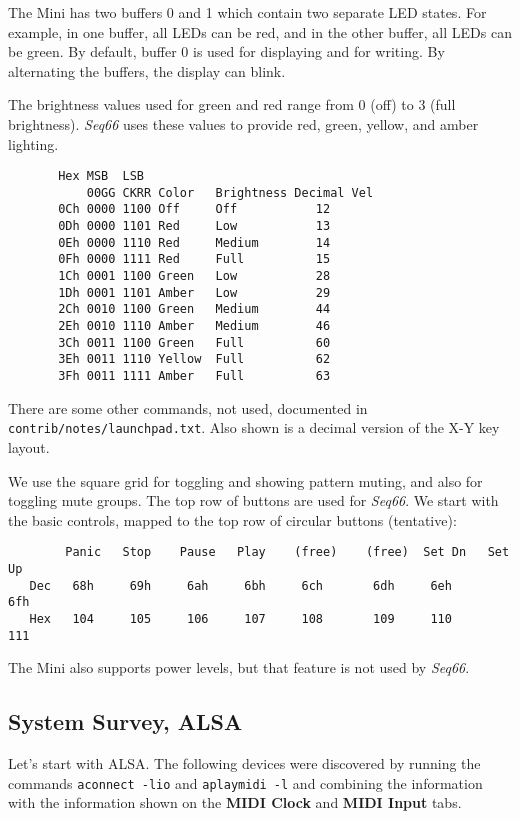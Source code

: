    The Mini has two buffers 0 and 1 which contain two separate LED states. For
   example, in one buffer, all LEDs can be red, and in the other buffer, all LEDs
   can be green.  By default, buffer 0 is used for displaying and for writing.
   By alternating the buffers, the display can blink.

   The brightness values used for green and red range from 0 (off) to 3 (full
   brightness).  \textsl{Seq66} uses these values to provide red, green, yellow,
   and amber lighting.

   \begin{verbatim}
       Hex MSB  LSB
           00GG CKRR Color   Brightness Decimal Vel
       0Ch 0000 1100 Off     Off           12
       0Dh 0000 1101 Red     Low           13
       0Eh 0000 1110 Red     Medium        14
       0Fh 0000 1111 Red     Full          15
       1Ch 0001 1100 Green   Low           28
       1Dh 0001 1101 Amber   Low           29
       2Ch 0010 1100 Green   Medium        44
       2Eh 0010 1110 Amber   Medium        46
       3Ch 0011 1100 Green   Full          60
       3Eh 0011 1110 Yellow  Full          62
       3Fh 0011 1111 Amber   Full          63
   \end{verbatim}

   There are some other commands, not used, documented in
   \texttt{contrib/notes/launchpad.txt}.
   Also shown is a decimal version of the X-Y key layout.

   We use the square grid for toggling and showing pattern muting, and also for
   toggling mute groups.
   The top row of buttons are used for \textsl{Seq66}. We start with the basic
   controls, mapped to the top row of circular buttons (tentative):

   \begin{verbatim}
        Panic   Stop    Pause   Play    (free)    (free)  Set Dn   Set Up
   Dec   68h     69h     6ah     6bh     6ch       6dh     6eh      6fh
   Hex   104     105     106     107     108       109     110      111
   \end{verbatim}

   The Mini also supports power levels, but that feature is not used by
   \textsl{Seq66}.

\subsection{System Survey, ALSA}
\label{subsec:launchpad_mini_survey_alsa}

   Let's start with ALSA.  The following devices were discovered by running the
   commands \texttt{aconnect -lio} and \texttt{aplaymidi -l} and combining the
   information with the information shown on the
   \textbf{MIDI Clock} and \textbf{MIDI Input} tabs.

